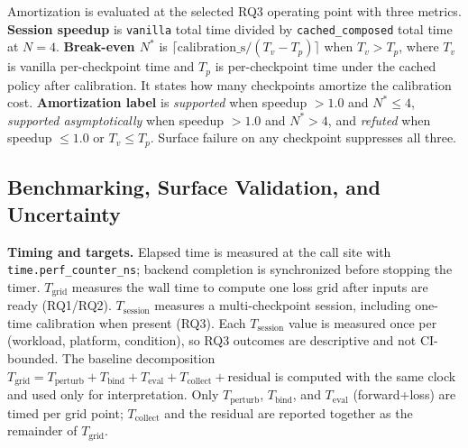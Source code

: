 Amortization is evaluated at the selected RQ3 operating point
with three metrics. \textbf{Session speedup} is
\texttt{vanilla} total time divided by
\texttt{cached\_composed} total time at $N=4$.
\textbf{Break-even $N^{*}$} is
$\lceil\text{calibration\_s}/(T_v-T_p)\rceil$ when
$T_v>T_p$, where $T_v$ is vanilla per-checkpoint time and
$T_p$ is per-checkpoint time under the cached policy after
calibration. It states how many checkpoints amortize the
calibration cost. \textbf{Amortization label} is
\emph{supported} when speedup $>1.0$ and $N^{*}\le 4$,
\emph{supported asymptotically} when speedup $>1.0$ and
$N^{*}>4$, and \emph{refuted} when speedup $\le 1.0$ or
$T_v\le T_p$. Surface failure on any checkpoint suppresses
all three.

\subsection{Benchmarking, Surface Validation, and
Uncertainty}\label{methods-benchmarking}

\textbf{Timing and targets.} Elapsed time is measured at the
call site with \texttt{time.perf\_counter\_ns}; backend
completion is synchronized before stopping the timer.
$T_{\text{grid}}$ measures the wall time to compute one loss
grid after inputs are ready (RQ1/RQ2).
$T_{\text{session}}$ measures a multi-checkpoint session,
including one-time calibration when present (RQ3). Each
$T_{\text{session}}$ value is measured once per (workload,
platform, condition), so RQ3 outcomes are descriptive and not
CI-bounded.
The baseline decomposition
$T_{\text{grid}}=T_{\text{perturb}}+T_{\text{bind}}+
T_{\text{eval}}+T_{\text{collect}}+\text{residual}$ is
computed with the same clock and used only for interpretation.
Only $T_{\text{perturb}}$, $T_{\text{bind}}$, and
$T_{\text{eval}}$ (forward+loss) are timed per grid point;
$T_{\text{collect}}$ and the residual are reported together as
the remainder of $T_{\text{grid}}$.

